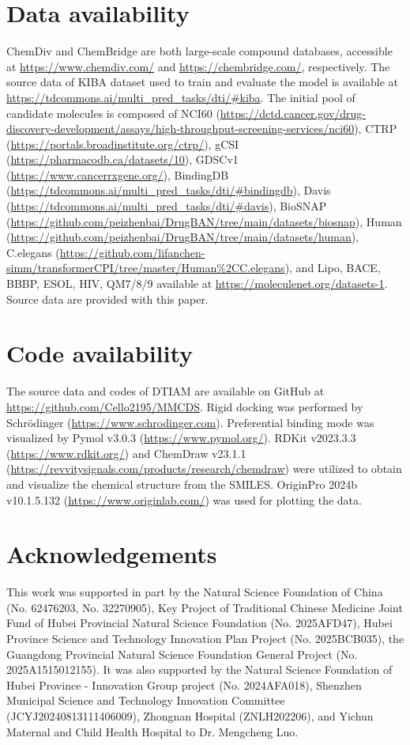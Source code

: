 \documentclass[preprint,12pt]{elsarticle}
\theoremstyle{plain}
\theoremstyle{definition}
\theoremstyle{remark}
\begin{document}
\section*{Data availability}

ChemDiv and ChemBridge are both large-scale compound databases, accessible at \url{https://www.chemdiv.com/} and \url{https://chembridge.com/}, respectively. The source data of KIBA dataset used to train and evaluate the model is available at \url{https://tdcommons.ai/multi_pred_tasks/dti/#kiba}. The initial pool of candidate molecules is composed of NCI60 (\url{https://dctd.cancer.gov/drug-discovery-development/assays/high-throughput-screening-services/nci60}), CTRP (\url{https://portals.broadinstitute.org/ctrp/}), gCSI (\url{https://pharmacodb.ca/datasets/10}), GDSCv1 (\url{https://www.cancerrxgene.org/}), BindingDB (\url{https://tdcommons.ai/multi_pred_tasks/dti/#bindingdb}), Davis (\url{https://tdcommons.ai/multi_pred_tasks/dti/#davis}), BioSNAP (\url{https://github.com/peizhenbai/DrugBAN/tree/main/datasets/biosnap}), Human (\url{https://github.com/peizhenbai/DrugBAN/tree/main/datasets/human}), C.elegans (\url{https://github.com/lifanchen-simm/transformerCPI/tree/master/Human%2CC.elegans}), and Lipo, BACE, BBBP, ESOL, HIV, QM7/8/9 available at \url{https://moleculenet.org/datasets-1}. Source data are provided with this paper.



\section*{Code availability}
The source data and codes of DTIAM are available on GitHub at \url{https://github.com/Cello2195/MMCDS}. Rigid docking was performed by Schrödinger (\url{https://www.schrodinger.com}). Preferential binding mode was visualized by Pymol v3.0.3 (\url{https://www.pymol.org/}). RDKit v2023.3.3 (\url{https://www.rdkit.org/}) and ChemDraw v23.1.1 (\url{https://revvitysignals.com/products/research/chemdraw}) were utilized to obtain and visualize the chemical structure from the SMILES. OriginPro 2024b v10.1.5.132 (\url{https://www.originlab.com/}) was used for plotting the data.


\section*{Acknowledgements}

This work was supported in part by the Natural Science Foundation of China (No. 62476203, No. 32270905), Key Project of Traditional Chinese Medicine Joint Fund of Hubei Provincial Natural Science Foundation (No. 2025AFD47), Hubei Province Science and Technology Innovation Plan Project (No. 2025BCB035), the Guangdong Provincial Natural Science Foundation General Project (No. 2025A1515012155). It was also supported by the Natural Science Foundation of Hubei Province - Innovation Group project (No. 2024AFA018), Shenzhen Municipal Science and Technology Innovation Committee (JCYJ20240813111406009), Zhongnan Hospital (ZNLH202206), and Yichun Maternal and Child Health Hospital to Dr. Mengcheng Luo.
\end{document}
